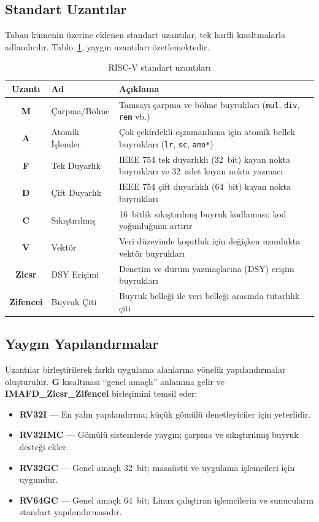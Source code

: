 \subsection{Standart Uzantılar}

Taban kümenin üzerine eklenen standart uzantılar, tek harfli kısaltmalarla adlandırılır. Tablo~\ref{tab:ekc-uzantilar}, yaygın uzantıları özetlemektedir.

\begin{table}[H]
\centering
\caption{RISC-V standart uzantıları}\label{tab:ekc-uzantilar}
\begin{tabular}{@{}clp{8cm}@{}}
\toprule
\textbf{Uzantı} & \textbf{Ad} & \textbf{Açıklama} \\
\midrule
\textbf{M} & Çarpma/Bölme & Tamsayı çarpma ve bölme buyrukları (\texttt{mul}, \texttt{div}, \texttt{rem} vb.) \\
\textbf{A} & Atomik İşlemler & Çok çekirdekli eşzamanlama için atomik bellek buyrukları (\texttt{lr}, \texttt{sc}, \texttt{amo*}) \\
\textbf{F} & Tek Duyarlık & IEEE 754 tek duyarlıklı (32~bit) kayan nokta buyrukları ve 32~adet kayan nokta yazmacı \\
\textbf{D} & Çift Duyarlık & IEEE 754 çift duyarlıklı (64~bit) kayan nokta buyrukları \\
\textbf{C} & Sıkıştırılmış & 16~bitlik sıkıştırılmış buyruk kodlaması; kod yoğunluğunu artırır \\
\textbf{V} & Vektör & Veri düzeyinde koşutluk için değişken uzunlukta vektör buyrukları \\
\textbf{Zicsr} & DSY Erişimi & Denetim ve durum yazmaçlarına (DSY) erişim buyrukları \\
\textbf{Zifencei} & Buyruk Çiti & Buyruk belleği ile veri belleği arasında tutarlılık çiti \\
\bottomrule
\end{tabular}
\end{table}

\subsection{Yaygın Yapılandırmalar}

Uzantılar birleştirilerek farklı uygulama alanlarına yönelik yapılandırmalar oluşturulur. \textbf{G} kısaltması ``genel amaçlı'' anlamına gelir ve \mbox{\textbf{IMAFD\_Zicsr\_Zifencei}} birleşimini temsil eder:

\begin{itemize}
    \item \textbf{RV32I} --- En yalın yapılandırma; küçük gömülü denetleyiciler için yeterlidir.
    \item \textbf{RV32IMC} --- Gömülü sistemlerde yaygın; çarpma ve sıkıştırılmış buyruk desteği ekler.
    \item \textbf{RV32GC} --- Genel amaçlı 32~bit; masaüstü ve uygulama işlemcileri için uygundur.
    \item \textbf{RV64GC} --- Genel amaçlı 64~bit; Linux çalıştıran işlemcilerin ve sunucuların standart yapılandırmasıdır.
\end{itemize}

